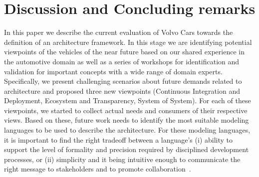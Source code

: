 \section{Discussion and Concluding remarks}\label{sec:conclusion}

In this paper we describe the current evaluation of Volvo Cars towards the definition of an architecture framework.
In this stage we are identifying potential viewpoints of the vehicles of the near future based on our shared experience in the automotive domain as well as a series of workshops for identification and validation for important concepts with a wide range of domain experts. 
Specifically, we present challenging scenarios about future demands related to architecture and proposed three new viewpoints (Continuous Integration and Deployment, Ecosystem and Transparency, System of System).
For each of these viewpoints, we started to collect actual needs and consumers of their respective views. 
Based on these, future work needs to identify the most suitable modeling languages to be used to describe the architecture. 
For these modeling languages, it is important to find the right tradeoff between a language's
(i) ability to support the level of formality and precision required by disciplined development processes, or
(ii) simplicity and it being intuitive enough to communicate the right message to stakeholders and to promote collaboration~\cite{whatindustrywants,IEEESoftwarePatrizio}.

